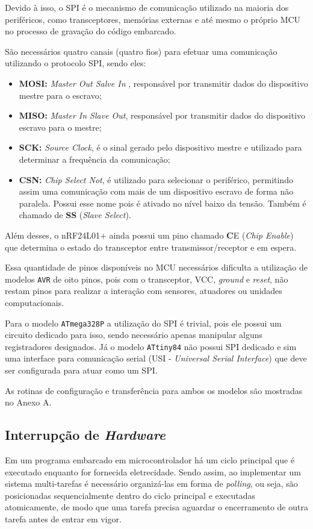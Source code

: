 Devido à isso, o SPI é o mecanismo de comunicação utilizado na maioria dos periféricos, como transceptores,
memórias externas e até mesmo o próprio MCU no processo de gravação do código embarcado.

São necessários quatro canais (quatro fios) para efetuar uma comunicação utilizando o protocolo SPI, sendo
eles:

\begin{itemize}
	\item \textbf{MOSI:} \textit{Master Out Salve In} , responsável por transmitir dados do dispositivo
		mestre para o escravo;
	\item \textbf{MISO:} \textit{Master In Slave Out}, responsável por transmitir dados do dispositivo
		escravo para o mestre;
	\item \textbf{SCK:} \textit{Source Clock}, é o sinal gerado pelo dispositivo mestre e
		utilizado para determinar a frequência da comunicação;
	\item \textbf{CSN:} \textit{Chip Select Not}, é utilizado para selecionar o periférico, permitindo
		assim uma comunicação com mais de um dispositivo escravo de forma não paralela. Possui esse
		nome pois é ativado no nível baixo da tensão. Também é chamado de \textbf{SS} (\textit{Slave Select}).
\end{itemize}

Além desses, o nRF24L01+ ainda possui um pino chamado \textbf{C}E (\textit{Chip Enable}) que determina o
estado do transceptor entre transmissor/receptor e em espera.

Essa quantidade de pinos disponíveis no MCU necessários dificulta a utilização de modelos \texttt{AVR} de oito
pinos, pois com o transceptor, VCC, \textit{ground} e \textit{reset}, não restam pinos para realizar a
interação com sensores, atuadores ou unidades computacionais.

Para o modelo \texttt{ATmega328P} a utilização do SPI é trivial, pois ele possui um circuito dedicado para
isso, sendo necessário apenas manipular alguns registradores designados. Já o modelo \texttt{ATtiny84} não
possui SPI dedicado e sim uma interface para comunicação serial (USI - \textit{Universal Serial Interface})
que deve ser configurada para atuar como um SPI.

As rotinas de configuração e transferência para ambos os modelos são mostradas no Anexo A.

\subsection{Interrupção de \textit{Hardware}}
Em um programa embarcado em microcontrolador há um ciclo principal que é executado enquanto for fornecida
eletrecidade. Sendo assim, ao implementar um sistema multi-tarefas é necessário organizá-las em forma de
\textit{polling}, ou seja, são posicionadas sequencialmente dentro do ciclo principal e executadas
atomicamente, de modo que uma tarefa precisa aguardar o encerramento de outra tarefa antes de entrar em vigor.

